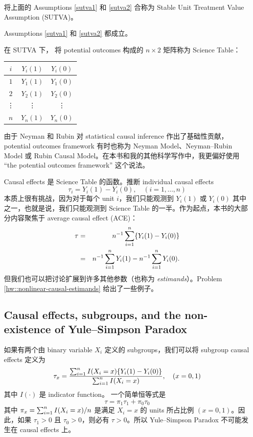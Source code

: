 \citet{Rubin:1980} 将上面的 Assumptions \ref{sutva1} 和 \ref{sutva2} 合称为 Stable Unit Treatment Value Assumption (SUTVA)。


\begin{assumption}
[SUTVA]
\label{sutva-complete}
Assumptions \ref{sutva1} 和 \ref{sutva2} 都成立。
\end{assumption}


在 SUTVA 下，\citet{Rubin:2005} 将 potential outcomes 构成的 $n\times 2$ 矩阵称为 Science Table：
\begin{center}
\begin{tabular}{ccc}
\hline 
$i$ & $Y_i(1)$ &  $Y_i(0)$ \\
 \hline 
$1$ & $Y_1(1)$ &  $Y_1(0)$ \\
$2$ & $Y_2(1)$ &  $Y_2(0)$ \\
\vdots  &\vdots & \vdots   \\
$n$ & $Y_n(1)$ &  $Y_n(0)$ \\
\hline 
\end{tabular}
\end{center}  


由于 Neyman 和 Rubin 对 statistical causal inference 作出了基础性贡献，potential outcomes framework 有时也称为 Neyman Model、Neyman--Rubin Model 或 Rubin Causal Model。在本书和我的其他科学写作中，我更偏好使用 ``the potential outcomes framework'' 这个说法。
 
 
Causal effects 是 Science Table 的函数。推断 individual causal effects
$$
\tau_i =  Y_i(1) - Y_i(0) ,\quad (i=1, \ldots, n)
$$ 
本质上很有挑战，因为对于每个 unit $i$，我们只能观测到 $Y_i(1)$ 或 $Y_i(0)$ 其中之一，也就是说，我们只能观测到 Science Table 的一半。作为起点，本书的大部分内容聚焦于 average causal effect (ACE)：
\begin{eqnarray*}
\tau  &=&  n^{-1} \sum_{i=1}^n \{  Y_i(1) - Y_i(0) \}  \\
&=&  n^{-1} \sum_{i=1}^n  Y_i(1) -  n^{-1} \sum_{i=1}^n  Y_i(0).
\end{eqnarray*} 
但我们也可以把讨论扩展到许多其他参数（也称为 {\it estimands}）。Problem \ref{hw::nonlinear-causal-estimands} 给出了一些例子。


\subsection{Causal effects, subgroups, and the non-existence of Yule--Simpson Paradox}


如果有两个由 binary variable $X_i $ 定义的 subgroups，我们可以将 subgroup causal effects 定义为
$$
\tau_x = \frac{  \sum_{i=1}^n  I(X_i = x) \{  Y_i(1) - Y_i(0) \}    }{   \sum_{i=1}^n  I(X_i = x)    },\quad (x=0,1) 
$$
其中 $I(\cdot)$ 是 indicator function。
一个简单恒等式是
$$
\tau =  \pi_1 \tau_1  +  \pi_0 \tau_0
$$
其中 $\pi_x =  \sum_{i=1}^n  I(X_i = x)  / n$ 是满足 $X_i = x$ 的 units 所占比例 $(x=0,1)$。因此，如果 $\tau_1  > 0$ 且 $ \tau_0 > 0$，则必有 $\tau > 0$。所以 Yule--Simpson Paradox 不可能发生在 causal effects 上。



